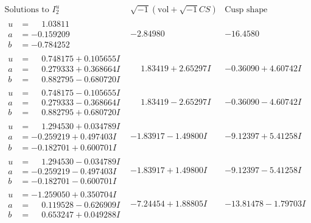 \documentclass[1p]{elsarticle_modified}
\theoremstyle{definition}
\newcommand{\I}{\sqrt{-1}}
\begin{document}
$$\begin{array}{c|c|c}  
\text{Solutions to }I^u_{2}& \I (\text{vol} + \sqrt{-1}CS) & \text{Cusp shape}\\
 \hline 
\begin{aligned}
u &= \phantom{-}1.03811\phantom{ +0.000000I} \\
a &= -0.159209\phantom{ +0.000000I} \\
b &= -0.784252\phantom{ +0.000000I}\end{aligned}
 & -2.84980\phantom{ +0.000000I} & -16.4580\phantom{ +0.000000I} \\ \hline\begin{aligned}
u &= \phantom{-}0.748175 + 0.105655 I \\
a &= \phantom{-}0.279333 + 0.368664 I \\
b &= \phantom{-}0.882795 - 0.680720 I\end{aligned}
 & \phantom{-}1.83419 + 2.65297 I & -0.36090 + 4.60742 I \\ \hline\begin{aligned}
u &= \phantom{-}0.748175 - 0.105655 I \\
a &= \phantom{-}0.279333 - 0.368664 I \\
b &= \phantom{-}0.882795 + 0.680720 I\end{aligned}
 & \phantom{-}1.83419 - 2.65297 I & -0.36090 - 4.60742 I \\ \hline\begin{aligned}
u &= \phantom{-}1.294530 + 0.034789 I \\
a &= -0.259219 + 0.497403 I \\
b &= -0.182701 + 0.600701 I\end{aligned}
 & -1.83917 - 1.49800 I & -9.12397 + 5.41258 I \\ \hline\begin{aligned}
u &= \phantom{-}1.294530 - 0.034789 I \\
a &= -0.259219 - 0.497403 I \\
b &= -0.182701 - 0.600701 I\end{aligned}
 & -1.83917 + 1.49800 I & -9.12397 - 5.41258 I \\ \hline\begin{aligned}
u &= -1.259050 + 0.350704 I \\
a &= \phantom{-}0.119528 - 0.626909 I \\
b &= \phantom{-}0.653247 + 0.049288 I\end{aligned}
 & -7.24454 + 1.88805 I & -13.81478 - 1.79703 I \\ \hline\begin{aligned}

\end{aligned}
\end{array}$$
\end{document}
